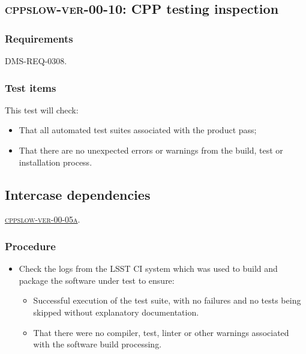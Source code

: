 \subsection{\textsc{cppslow-ver-00-10}: CPP testing inspection}
\label{cppslow-ver-00-10}

\subsubsection{Requirements}

DMS-REQ-0308.

\subsubsection{Test items}

This test will check:

\begin{itemize}

  \item{That all automated test suites associated with the product pass;}
  \item{That there are no unexpected errors or warnings from the build, test
  or installation process.}

\end{itemize}

\subsection{Intercase dependencies}

\hyperref[cppslow-ver-00-05]{\textsc{cppslow-ver-00-05a}}.

\subsubsection{Procedure}

\begin{itemize}

  \item{Check the logs from the LSST CI system which was used to build and
  package the software under test to ensure:

    \begin{itemize}

      \item{Successful execution of the test suite, with no failures and no
      tests being skipped without explanatory documentation.}

      \item{That there were no compiler, test, linter or other warnings
      associated with the software build processing.}

    \end{itemize}
  }

\end{itemize}
